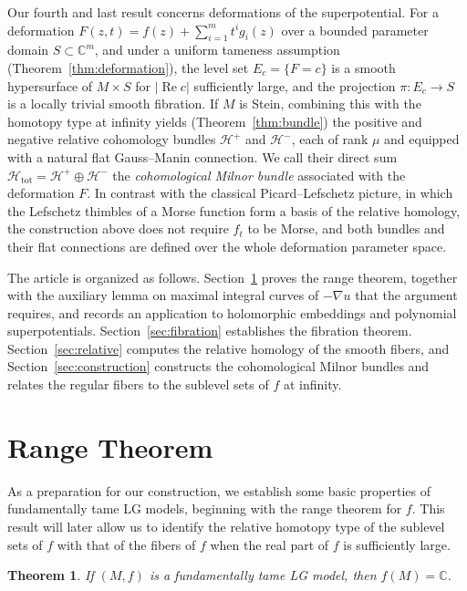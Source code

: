 \documentclass[11pt]{amsart}
\theoremstyle{plain}
\newtheorem{theorem}{Theorem}[section]
\theoremstyle{definition}
\theoremstyle{remark}
\numberwithin{equation}{section}
\begin{document}
Our fourth and last result concerns deformations of the superpotential.
For a deformation $F(z,t)=f(z)+\sum_{i=1}^{m}t^i g_i(z)$ over a bounded parameter domain $S\subset \mathbb{C}^m$, and under a uniform tameness assumption (Theorem~\ref{thm:deformation}), the level set $E_c=\{F=c\}$ is a smooth hypersurface of $M\times S$ for $|\operatorname{Re} c|$ sufficiently large, and the projection $\pi:E_c\to S$ is a locally trivial smooth fibration.
If $M$ is Stein, combining this with the homotopy type at infinity yields (Theorem~\ref{thm:bundle}) the positive and negative relative cohomology bundles $\mathcal{H}^{+}$ and $\mathcal{H}^{-}$, each of rank $\mu$ and equipped with a natural flat Gauss--Manin connection.
We call their direct sum $\mathcal{H}_{\mathrm{tot}}=\mathcal{H}^{+}\oplus\mathcal{H}^{-}$ the \emph{cohomological Milnor bundle} associated with the deformation $F$.
In contrast with the classical Picard--Lefschetz picture, in which the Lefschetz thimbles of a Morse function form a basis of the relative homology, the construction above does not require $f_t$ to be Morse, and both bundles and their flat connections are defined over the whole deformation parameter space.

The article is organized as follows.
Section~\ref{sec:range} proves the range theorem, together with the auxiliary lemma on maximal integral curves of $-\nabla u$ that the argument requires, and records an application to holomorphic embeddings and polynomial superpotentials.
Section~\ref{sec:fibration} establishes the fibration theorem.
Section~\ref{sec:relative} computes the relative homology of the smooth fibers, and Section~\ref{sec:construction} constructs the cohomological Milnor bundles and relates the regular fibers to the sublevel sets of $f$ at infinity.

\section{Range Theorem}\label{sec:range}

As a preparation for our construction, we establish some basic properties of fundamentally tame LG models, beginning with the range theorem for $f$.
This result will later allow us to identify the relative homotopy type of the sublevel sets of $f$ with that of the fibers of $f$ when the real part of $f$ is sufficiently large.

\begin{theorem}\label{thm:range}
    If $(M, f)$ is a fundamentally tame LG model, then $f(M) = \mathbb{C}$.
\end{theorem}
\end{document}
